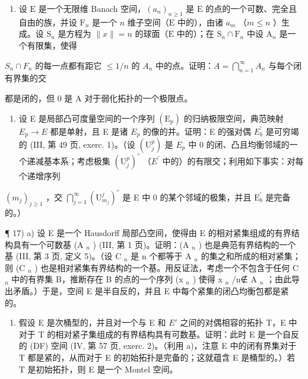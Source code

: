 \begin{enumerate}
\def\labelenumi{\arabic{enumi})}
\setcounter{enumi}{14}
\tightlist
\item
  设 \(\mathrm{E}\) 是一个无限维 Banach 空间，\((a_{n})_{n\geqslant 1}\) 是 \(\mathrm{E}\) 的点的一个可数、完全且自由的族，并设 \(\mathrm{F}_n\) 是一个 \(n\) 维子空间（\(\mathrm{E}\) 中的），由诸 \(a_{m}\) （\(m\leqslant n\) ）生成。设 \(\mathrm{S}_n\) 是方程为 \(\| x\| = n\) 的球面（\(\mathrm{E}\) 中的）；在 \(\mathrm{S}_n\cap \mathrm{F}_n\) 中设 \(\mathrm{A}_n\) 是一个有限集，使得
\end{enumerate}

\(S_{n} \cap F_{n}\) 的每一点都有距它 \(\leqslant 1/n\) 的 \(A_{n}\) 中的点。证明：\(A = \bigcap_{n=1}^{\infty} A_{n}\) 与每个闭有界集的交

都是闭的，但 0 是 A 对于弱化拓扑的一个极限点。

\begin{enumerate}
\def\labelenumi{\arabic{enumi})}
\setcounter{enumi}{15}
\tightlist
\item
  设 E 是局部凸可度量空间的一个序列 \((\mathrm{E}_{p})\) 的归纳极限空间，典范映射 \(E_{p} \rightarrow E\) 都是单射，且 E 是诸 \(E_{p}\) 的像的并。证明：E 的强对偶 \(E_{b}^{\prime}\) 是可穷竭的 (III, 第 49 页, exerc. 1)。（设 \((\mathrm{U}_{j}^{p})\) 是 \(E_{p}\) 中 0 的闭、凸且均衡邻域的一个递减基本系；考虑极集 \((\mathrm{U}_{j}^{p})^{\circ}\) （\(E^{\prime}\) 中的）的有限交；利用如下事实：对每个递增序列
\end{enumerate}

\((m_{j})_{j\geqslant 1}\) ，交 \(\bigcap_{j = 1}^{\infty}(\mathrm{U}_{m_j}^j)^{\circ}\) 是 E 中 0 的某个邻域的极集，并且 \(\mathrm{E}_b^\prime\) 是完备的。）

¶ 17) a) 设 E 是一个 Hausdorff 局部凸空间，使得由 E 的相对紧集组成的有界结构具有一个可数基 (A \(_{n}\) ) (III, 第 1 页)。证明：(A \(_{n}\) ) 也是典范有界结构的一个基 (III, 第 3 页, 定义 5)。（设 C \(_{n}\) 是 n 个都等于 A \(_{n}\) 的集之和所成的相对紧集；则 (C \(_{n}\) ) 也是相对紧集有界结构的一个基。用反证法，考虑一个不包含于任何 C \(_{n}\) 中的有界集 B，推断存在 B 的点的一个序列 (x \(_{n}\) ) 使得 x \(_{n}\) /n∉ A \(_{n}\) ；由此导出矛盾。）于是，空间 E 是半自反的，并且 E 中每个紧集的闭凸均衡包都是紧的。

\begin{enumerate}
\def\labelenumi{\alph{enumi})}
\setcounter{enumi}{1}
\tightlist
\item
  假设 E 是次桶型的，并且对一个与 E 和 \(E'\) 之间的对偶相容的拓扑 T，E 中对于 T 的相对紧子集组成的有界结构具有可数基。证明：此时 E 是一个自反的 (DF) 空间 (IV, 第 57 页, exerc. 2)。（利用 a)，注意 E 中的闭有界集对于 T 都是紧的，从而对于 E 的初始拓扑是完备的；这就蕴含 E 是桶型的。）若 T 是初始拓扑，则 E 是一个 Montel 空间。
\end{enumerate}


